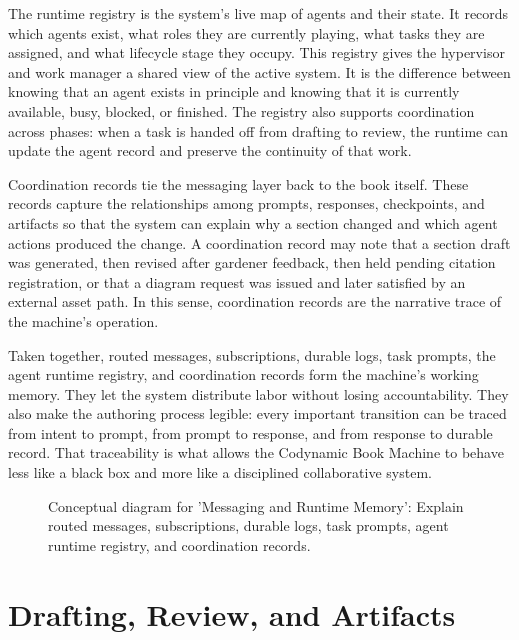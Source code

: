 \documentclass[11pt]{article}
\begin{document}
The runtime registry is the system's live map of agents and their state. It records which agents exist, what roles they are currently playing, what tasks they are assigned, and what lifecycle stage they occupy. This registry gives the hypervisor and work manager a shared view of the active system. It is the difference between knowing that an agent exists in principle and knowing that it is currently available, busy, blocked, or finished. The registry also supports coordination across phases: when a task is handed off from drafting to review, the runtime can update the agent record and preserve the continuity of that work.

Coordination records tie the messaging layer back to the book itself. These records capture the relationships among prompts, responses, checkpoints, and artifacts so that the system can explain why a section changed and which agent actions produced the change. A coordination record may note that a section draft was generated, then revised after gardener feedback, then held pending citation registration, or that a diagram request was issued and later satisfied by an external asset path. In this sense, coordination records are the narrative trace of the machine's operation.

Taken together, routed messages, subscriptions, durable logs, task prompts, the agent runtime registry, and coordination records form the machine's working memory. They let the system distribute labor without losing accountability. They also make the authoring process legible: every important transition can be traced from intent to prompt, from prompt to response, and from response to durable record. That traceability is what allows the Codynamic Book Machine to behave less like a black box and more like a disciplined collaborative system.

\begin{figure}[htbp]
\centering

\caption{Conceptual diagram for 'Messaging and Runtime Memory': Explain routed messages, subscriptions, durable logs, task prompts, agent runtime registry, and coordination records.}
\end{figure}



\section{Drafting, Review, and Artifacts}
\end{document}
